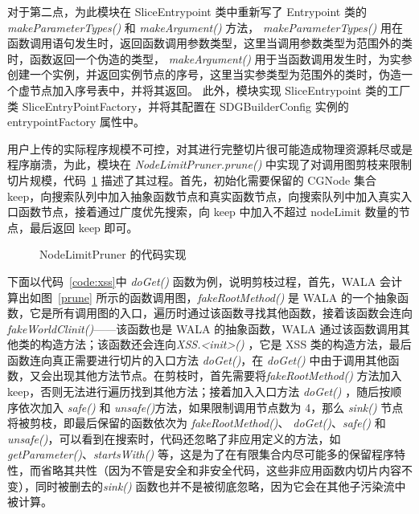 对于第二点，为此模块在 SliceEntrypoint 类中重新写了 Entrypoint 类的\textit{ makeParameterTypes()} 和 \textit{makeArgument()} 方法，\textit{ makeParameterTypes()} 用在函数调用语句发生时，返回函数调用参数类型，这里当调用参数类型为范围外的类时，函数返回一个伪造的类型，\textit{ makeArgument()} 用于当函数调用发生时，为实参创建一个实例，并返回实例节点的序号，这里当实参类型为范围外的类时，伪造一个虚节点加入序号表中，并将其返回。
此外，模块实现 SliceEntrypoint 类的工厂类 SliceEntryPointFactory，并将其配置在 SDGBuilderConfig 实例的 entrypointFactory 属性中。


用户上传的实际程序规模不可控，对其进行完整切片很可能造成物理资源耗尽或是程序崩溃，为此，模块在 \textit{NodeLimitPruner.prune()} 中实现了对调用图剪枝来限制切片规模，代码~\ref{code:slicePruner} 描述了其过程。首先，初始化需要保留的 CGNode 集合 keep，向搜索队列中加入抽象函数节点和真实函数节点，向搜索队列中加入真实入口函数节点，接着通过广度优先搜索，向 keep 中加入不超过 nodeLimit 数量的节点，最后返回 keep 即可。

\begin{figure}[htbp]
    \centering
    \begin{minipage}{0.9\textwidth}
        
    \end{minipage}
    \caption{NodeLimitPruner 的代码实现}\label{code:slicePruner}
\end{figure}

下面以代码~\ref{code:xss}中 \textit{doGet()} 函数为例，说明剪枝过程，首先，WALA 会计算出如图~\ref{prune} 所示的函数调用图，\textit{fakeRootMethod()} 是 WALA 的一个抽象函数，它是所有调用图的入口，遍历时通过该函数寻找其他函数，接着该函数会连向 \textit{fakeWorldClinit()}——该函数也是 WALA 的抽象函数，WALA 通过该函数调用其他类的构造方法；该函数还会连向\textit{XSS.<init>()} ，它是 XSS 类的构造方法，最后函数连向真正需要进行切片的入口方法 \textit{doGet()}，在 \textit{doGet()} 中由于调用其他函数，又会出现其他方法节点。在剪枝时，首先需要将\textit{fakeRootMethod()} 方法加入 keep，否则无法进行遍历找到其他方法；接着加入入口方法 \textit{doGet()} ，随后按顺序依次加入 \textit{safe()} 和 \textit{unsafe()}方法，如果限制调用节点数为 4，那么 \textit{sink()} 节点将被剪枝，即最后保留的函数依次为 \textit{fakeRootMethod()}、 \textit{doGet()}、\textit{safe()} 和 \textit{unsafe()}，可以看到在搜索时，代码还忽略了非应用定义的方法，如\textit{getParameter()}、\textit{startsWith()} 等，这是为了在有限集合内尽可能多的保留程序特性，而省略其共性（因为不管是安全和非安全代码，这些非应用函数内切片内容不变），同时被删去的\textit{sink()} 函数也并不是被彻底忽略，因为它会在其他子污染流中被计算。
    

